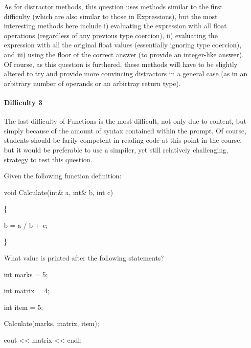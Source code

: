 \documentclass{article}
\begin{document}
As for distractor methods, this question uses methods similar to the first difficulty (which are also similar to those in Expressions), but the most interesting methods here include i) evaluating the expression with all float operations (regardless of any previous type coercion), ii) evaluating the expression with all the original float values (essentially ignoring type coercion), and iii) using the floor of the correct answer (to provide an integer-like answer). Of course, as this question is furthered, these methods will have to be slightly altered to try and provide more convincing distractors in a general case (as in an arbitrary number of operands or an arbirtray return type).

\paragraph{Difficulty 3} \hfill \par

The last difficulty of Functions is the most difficult, not only due to content, but simply because of the amount of syntax contained within the prompt. Of course, students should be farily competent in reading code at this point in the course, but it would be preferable to use a simpiler, yet still relatively challenging, strategy to test this question.

\hfill \par
Given the following function definition:\par
void Calculate(int\& a, int\& b, int c)\par
\{\par
	b = a / b + c;\par
\}\par

What value is printed after the following statements?\par
int marks = 5;\par
int matrix = 4;\par
int item = 5;\par
Calculate(marks, matrix, item);\par
cout << matrix << endl;\par
\hfill \par
\end{document}

